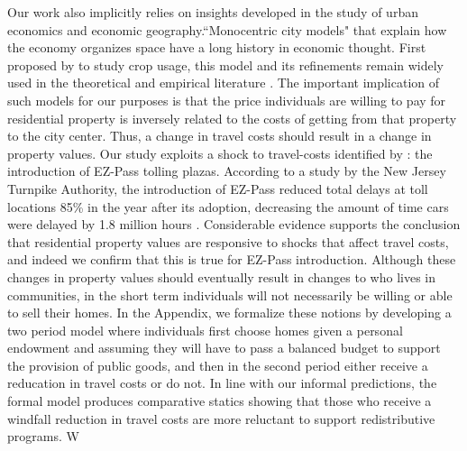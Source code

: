 Our work also implicitly relies on insights developed in the study of urban economics and economic geography.``Monocentric city models" that explain how the economy organizes space have a long history in economic thought. First proposed by \textcite{Thunen1826} to study crop usage, this model and its refinements remain widely used in the theoretical and empirical literature \parencite{Alonso,Fujita1999,BaumSnow2007}. The important implication of such models for our purposes is that the price individuals are willing to pay for residential property is inversely related to the costs of getting from that property to the city center. Thus, a change in travel costs should result in a change in property values. Our study exploits a shock to travel-costs identified by \textcite{Currie2011a}: the introduction of EZ-Pass tolling plazas. According to a study by the New Jersey Turnpike Authority, the introduction of EZ-Pass reduced total delays at toll locations 85\% in the year after its adoption, decreasing the amount of time cars were delayed by 1.8 million hours \parencite{NJT2001}. Considerable evidence supports the conclusion that residential property values are responsive to shocks that affect travel costs, and indeed we confirm that this is true for EZ-Pass introduction. Although these changes in property values should eventually result in changes to who lives in communities, in the short term individuals will not necessarily be willing or able to sell their homes. In the Appendix, we formalize these notions by developing a two period model where individuals first choose homes given a personal endowment and assuming they will have to pass a balanced budget to support the provision of public goods, and then in the second period either receive a reducation in travel costs or do not. In line with our informal predictions, the formal model produces comparative statics showing that those who receive a windfall reduction in travel costs are more reluctant to support redistributive programs. W



